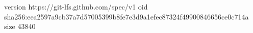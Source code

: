 version https://git-lfs.github.com/spec/v1
oid sha256:eea2597a9cb37a7d57005399b8fe7e3d9a1efec87324f49900846656ce0c714a
size 43840
